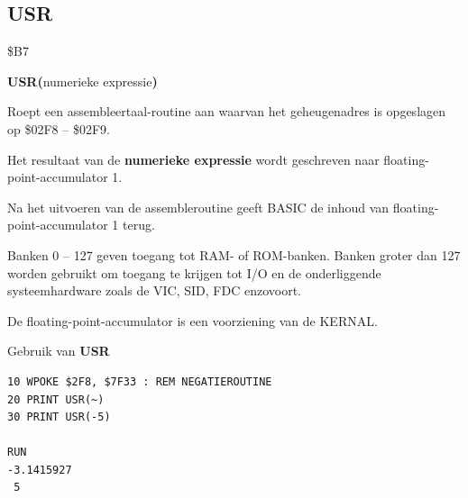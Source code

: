 \subsection{USR}
\begin{description}[leftmargin=2cm,style=nextline]
\item [Token:]    \$B7

\item [Formaat:]   {\bf USR(}numerieke expressie{\bf)}

\item [Gebruik:]    Roept een assembleertaal-routine aan waarvan het geheugenadres is opgeslagen op  \$02F8 -- \$02F9.

                  Het resultaat van de {\bf numerieke expressie} wordt geschreven naar floating-point-accumulator 1.

                  Na het uitvoeren van de assembleroutine geeft BASIC de inhoud van floating-point-accumulator 1 terug.

\item [Opmerkingen:]  Banken 0 -- 127 geven toegang tot RAM- of ROM-banken. Banken groter dan 127 worden gebruikt om toegang te krijgen tot I/O en de onderliggende systeemhardware zoals de VIC, SID, FDC enzovoort.

                  De floating-point-accumulator is een voorziening van de KERNAL.

\item [Voorbeeld:]  Gebruik van {\bf USR}

\begin{tcolorbox}[colback=black,coltext=white]
\verbatimfont{\codefont}
\begin{verbatim}
10 WPOKE $2F8, $7F33 : REM NEGATIEROUTINE
20 PRINT USR(~)
30 PRINT USR(-5)

RUN
-3.1415927
 5
\end{verbatim}
\end{tcolorbox}
\end{description}


\newpage
